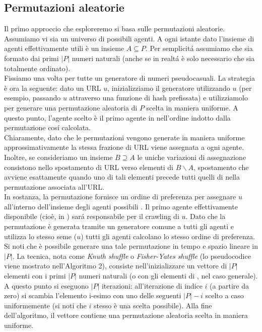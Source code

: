 \subsection{Permutazioni aleatorie}
Il primo approccio che esploreremo si basa sulle permutazioni aleatorie. Assumiamo vi sia un universo  di possibili agenti. A ogni istante dato l'insieme di agenti effettivamente utili è un insieme $A \subseteq P$. Per semplicitá assumiamo che  sia formato dai primi $|P|$ numeri naturali (anche se in realtá è solo necessario che  sia totalmente ordinato).\\
Fissiamo una volta per tutte un generatore di numeri pseudocasuali. La strategia è ora la seguente: dato un URL $u$, inizializziamo il generatore utilizzando $u$ (per esempio, passando $u$ attraverso una funzione di hash prefissata) e utilizziamolo per generare una permutazione aleatoria di $P$ scelta in maniera uniforme. A questo punto, l'agente scelto è il primo agente in  nell'ordine indotto dalla permutazione cosí calcolata.\\
Chiaramente, dato che le permutazioni vengono generate in maniera uniforme approssimativamente la stessa frazione di URL viene assegnata a ogni agente. Inoltre, se consideriamo un insieme $B \supseteq A$ le uniche variazioni di assegnazione consistono nello spostamento di URL verso elementi di $B \smallsetminus A$, spostamento che avviene esattamente quando uno di tali elementi precede tutti quelli di  nella permutazione associata all'URL.\\
In sostanza, la permutazione fornisce un ordine di preferenza per assegnare $u$ all'interno dell'insieme degli agenti possibili . Il primo agente effettivamente disponibile (cioè, in ) sará responsabile per il crawling di $u$. Dato che la permutazione è generata tramite un generatore comune a tutti gli agenti e utilizza lo stesso seme ($u$) tutti gli agenti calcolano lo stesso ordine di preferenza.\\
Si noti che è possibile generare una tale permutazione in tempo e spazio lineare in $|P|$. La tecnica, nota come \textit{Knuth shuffle} o \textit{Fisher-Yates shuffle} (lo pseudocodice viene mostrato nell'Algoritmo 2), consiste nell'inizializzare un vettore di $|P|$ elementi con i primi $|P|$ numeri naturali (o con gli elementi di , nel caso generale).\\
A questo punto si eseguono $|P|$ iterazioni: all'iterazione di indice $i$ (a partire da zero) si scambia l'elemento i-esimo con uno delle seguenti $|P| - i$ scelto a caso uniformemente (si noti che $i$ stesso è una scelta possibile). Alla fine dell'algoritmo, il vettore contiene una permutazione aleatoria scelta in maniera uniforme.

